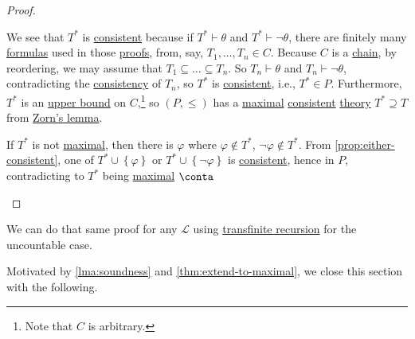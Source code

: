 \begin{proof}
\begin{explanation}
		We see that \(T^{\ast} \) is \hyperref[def:consistent]{consistent} because if \(T^{\ast} \vdash \theta \) and \(T^{\ast} \vdash \lnot \theta \), there are finitely many \hyperref[def:formula]{formulas} used in those \hyperref[def:proof]{proofs}, from, say, \(T_1, \dots , T_n \in C\). Because \(C\) is a \hyperref[def:chain]{chain}, by reordering, we may assume that \(T_1 \subseteq \dots \subseteq T_n\). So \(T_n \vdash \theta \) and \(T_n \vdash \lnot \theta \), contradicting the \hyperref[def:consistent]{consistency} of \(T_n\), so \(T^{\ast} \) is \hyperref[def:consistent]{consistent}, i.e., \(T^{\ast} \in P\). Furthermore, \(T^{\ast} \) is an \hyperref[def:upper-bound]{upper bound} on \(C\),\footnote{Note that \(C\) is arbitrary.} so \((P, \leq )\) has a \hyperref[def:POS-maximal]{maximal} \hyperref[def:consistent]{consistent} \hyperref[def:theory]{theory} \(T^{\ast} \supseteq T \) from \hyperref[thm:Zorn]{Zorn's lemma}.

		If \(T^{\ast} \) is not \hyperref[def:maximal]{maximal}, then there is \(\varphi \) where \(\varphi \notin T^{\ast} \), \(\lnot \varphi \notin T^{\ast} \). From \autoref{prop:either-consistent}, one of \(T^{\ast} \cup \left\{ \varphi  \right\} \) or \(T^{\ast} \cup \left\{ \lnot \varphi  \right\} \) is \hyperref[def:consistent]{consistent}, hence in \(P\), contradicting to \(T^{\ast} \) being \hyperref[def:POS-maximal]{maximal} \(\conta\)
	\end{explanation}
\end{proof}

\begin{remark}
	We can do that same proof for any \(\mathcal{L} \) using \href{https://en.wikipedia.org/wiki/Transfinite_induction}{transfinite recursion} for the uncountable case.
\end{remark}

Motivated by \autoref{lma:soundness} and \autoref{thm:extend-to-maximal}, we close this section with the following.

